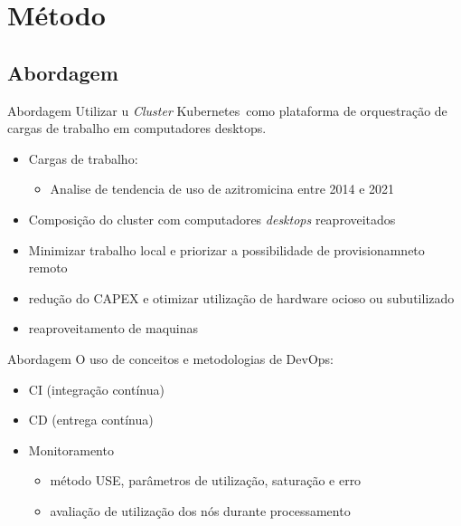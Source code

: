 \documentclass[10pt,brazil]{beamer}
\theoremstyle{definition}
\begin{document}
\section{Método}

\subsection{Abordagem}
\begin{frame}[allowframebreaks]{Abordagem}
  Utilizar u \emph{Cluster} Kubernetes\textregistered\ como plataforma de orquestração de cargas de trabalho em computadores desktops.
  \begin{itemize}
    \item Cargas de trabalho:
          \begin{itemize}
            \item Analise de tendencia de uso de azitromicina entre 2014 e 2021
          \end{itemize}
        \item Composição do cluster com computadores \emph{desktops} reaproveitados
        \item Minimizar trabalho local e priorizar a possibilidade de provisionamneto remoto
        \item redução do CAPEX e otimizar utilização de hardware ocioso ou subutilizado
        \item reaproveitamento de maquinas
    \end{itemize}
\end{frame}

\begin{frame}{Abordagem}
  O uso de conceitos e metodologias de DevOps:
  \begin{itemize}
            \item CI (integração contínua) 
            \item CD (entrega contínua)
    \item Monitoramento
        \begin{itemize}
            \item método USE, parâmetros de utilização, saturação e erro 
            \item avaliação de utilização dos nós durante processamento
        \end{itemize}
  \end{itemize}
\end{frame}

\end{document}
